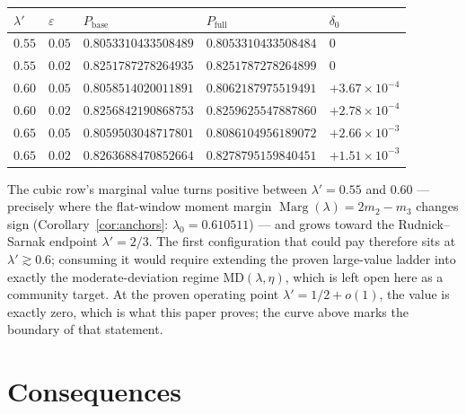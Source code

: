 \documentclass[11pt]{article}
\theoremstyle{plain}
\theoremstyle{definition}
\theoremstyle{remark}
\newcommand{\Marg}{\operatorname{Marg}}
\begin{document}
\begin{table}[h]
\centering
\begin{tabular}{@{}lllll@{}}
\toprule
$\lambda'$ & $\varepsilon$ & $P_{\mathrm{base}}$ & $P_{\mathrm{full}}$ &
$\delta_0$ \\
\midrule
$0.55$ & $0.05$ & $0.8053310433508489$ & $0.8053310433508484$ & $0$ \\
$0.55$ & $0.02$ & $0.8251787278264935$ & $0.8251787278264899$ & $0$ \\
$0.60$ & $0.05$ & $0.8058514020011891$ & $0.8062187975519491$ &
$+3.67 \times 10^{-4}$ \\
$0.60$ & $0.02$ & $0.8256842190868753$ & $0.8259625547887860$ &
$+2.78 \times 10^{-4}$ \\
$0.65$ & $0.05$ & $0.8059503048717801$ & $0.8086104956189072$ &
$+2.66 \times 10^{-3}$ \\
$0.65$ & $0.02$ & $0.8263688470852664$ & $0.8278795159840451$ &
$+1.51 \times 10^{-3}$ \\
\bottomrule
\end{tabular}
\end{table}

The cubic row's marginal value turns positive between $\lambda' = 0.55$ and
$0.60$ --- precisely where the flat-window moment margin
$\Marg(\lambda) = 2 m_2 - m_3$ changes sign (Corollary~\ref{cor:anchors}:
$\lambda_0 = 0.610511$) --- and grows toward the Rudnick--Sarnak endpoint
$\lambda' = 2/3$. The first configuration that could pay therefore sits at
$\lambda' \gtrsim 0.6$; consuming it would require extending the proven
large-value ladder into exactly the moderate-deviation regime
$\mathrm{MD}(\lambda, \eta)$, which is left open here as a community
target. At the proven operating point $\lambda' = 1/2 + o(1)$, the value is
exactly zero, which is what this paper proves; the curve above marks the
boundary of that statement.

\section{Consequences}
\label{sec:consequences}
\end{document}
